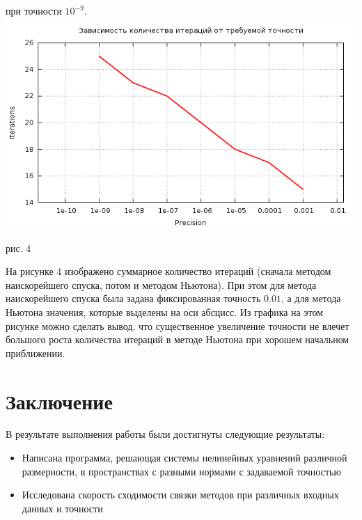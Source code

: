 \documentclass[a4paper, 12pt]{article}
\begin{document}
при точности $10^{-9}$.
\vfil
\newpage
\noindent \includegraphics[width=\linewidth]{eps.png}
	\begin{center}
		рис. 4\\
	\end{center}
\vfil
На рисунке 4 изображено суммарное количество итераций (сначала методом наискорейшего спуска, потом и методом Ньютона). При этом для метода наискорейшего спуска была
задана фиксированная точность $0.01$, а для метода Ньютона значения, которые выделены на оси абсцисс. Из графика на этом рисунке можно сделать вывод, что существенное увеличение точности
не влечет большого роста количества итераций в методе Ньютона при хорошем начальном приближении.
\newpage
\section*{Заключение}
В результате выполнения работы были достигнуты следующие результаты:\\
\begin{itemize}
	\item Написана программа, решающая системы нелинейных уравнений различной размерности, в пространствах с разными нормами с задаваемой точностью
	\item Исследована скорость сходимости связки методов при различных входных данных и точности
\end{itemize}
\newpage
{}
\nocite{nm_verg_a}
\nocite{nm_verg_m}
\nocite{RH}
\nocite{RS}

\end{document}
